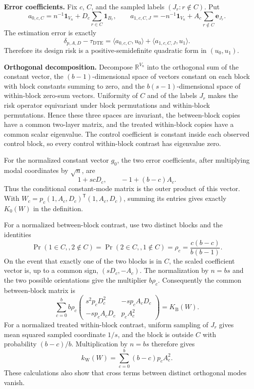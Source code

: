 \textbf{Error coefficients.}  Fix \(c\), \(C\), and the sampled labels \((J_r:r\notin C)\).  Put
\[
a_{0,c,C}=n^{-1}\mathbf 1_{V_n}+D_c\sum_{r\in C}\mathbf 1_{B_r},
\qquad
a_{1,c,C,J}=-n^{-1}\mathbf 1_{V_n}+A_c\sum_{r\notin C}\mathbf e_{J_r}.
\]
The estimation error is exactly
\[
\delta_{p,A,D}-\tau_{\mathrm{DTE}}
=\langle a_{0,c,C},u_0\rangle+\langle a_{1,c,C,J},u_1\rangle.
\]
Therefore its design risk is a positive-semidefinite quadratic form in \((u_0,u_1)\).

\textbf{Orthogonal decomposition.}  Decompose \(\mathbb R^{V_n}\) into the orthogonal sum of the constant vector, the \((b-1)\)-dimensional space of vectors constant on each block with block constants summing to zero, and the \(b(s-1)\)-dimensional space of within-block zero-sum vectors.  Uniformity of \(C\) and of the labels \(J_r\) makes the risk operator equivariant under block permutations and within-block permutations.  Hence these three spaces are invariant, the between-block copies have a common two-layer matrix, and the treated within-block copies have a common scalar eigenvalue.  The control coefficient is constant inside each observed control block, so every control within-block contrast has eigenvalue zero.

For the normalized constant vector \(g_0\), the two error coefficients, after multiplying modal coordinates by \(\sqrt n\), are
\[
1+scD_c,
\qquad
-1+(b-c)A_c.
\]
Thus the conditional constant-mode matrix is the outer product of this vector.  With
\(W_c=p_c(1,A_c,D_c)^{\mathsf T}(1,A_c,D_c)\), summing its entries gives exactly
\(K_0(W)\) in the definition.

For a normalized between-block contrast, use two distinct blocks and the identities
\[
\Pr(1\in C,,2\notin C)=\Pr(2\in C,,1\notin C)
=\rho_c=\frac{c(b-c)}{b(b-1)}.
\]
On the event that exactly one of the two blocks is in \(C\), the scaled coefficient vector is, up to a common sign, \((sD_c,-A_c)\).  The normalization by \(n=bs\) and the two possible orientations give the multiplier \(b\rho_c\).  Consequently the common between-block matrix is
\[
\sum_{c=0}^b b\rho_c
\begin{pmatrix}
s^2p_cD_c^2&-sp_cA_cD_c\\
-sp_cA_cD_c&p_cA_c^2
\end{pmatrix}
=K_{\mathrm B}(W).
\]
For a normalized treated within-block contrast, uniform sampling of \(J_r\) gives mean squared sampled coordinate \(1/s\), and the block is outside \(C\) with probability \((b-c)/b\).  Multiplication by \(n=bs\) therefore gives
\[
k_{\mathrm W}(W)=\sum_{c=0}^b(b-c)p_cA_c^2.
\]
These calculations also show that cross terms between distinct orthogonal modes vanish.

